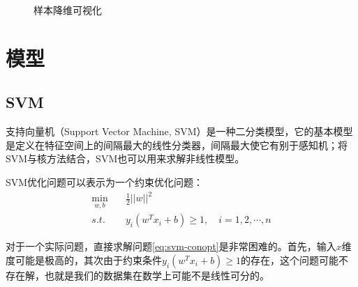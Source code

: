 \documentclass{article}
\begin{document}
\begin{figure}[h!]
    \centering
    \hspace{0.5cm}
    \caption{样本降维可视化}
    \label{fig:low-dim-visual}
\end{figure}

\section{模型} %

\subsection{SVM}

支持向量机（Support Vector Machine, SVM）是一种二分类模型，它的基本模型是定义在特征空间上的间隔最大的线性分类器，间隔最大使它有别于感知机；将SVM与核方法结合，SVM也可以用来求解非线性模型。

SVM优化问题可以表示为一个约束优化问题：
\begin{equation}
\begin{aligned}
\min_{w,b} \quad & \frac{1}{2}||w||^2 \\
s.t. \quad & y_i(w^Tx_i+b) \geq 1, \quad i=1,2,\cdots,n
\end{aligned}
\label{eq:svm-conopt}
\end{equation}

对于一个实际问题，直接求解问题\ref*{eq:svm-conopt}是非常困难的。首先，输入$x$维度可能是极高的，其次由于约束条件$y_i(w^Tx_i+b) \geq 1$的存在，这个问题可能不存在解，也就是我们的数据集在数学上可能不是线性可分的。
\end{document}
